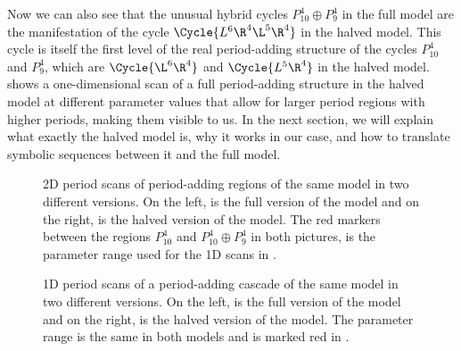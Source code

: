 Now we can also see that the unusual hybrid cycles $P_{10}^4 \oplus P_9^4$ in the full model are the manifestation of the cycle $\Cycle{L^6\R^4\L^5\R^4}$ in the halved model.
This cycle is itself the first level of the real period-adding structure of the cycles $P_{10}^4$ and $P_9^4$, which are $\Cycle{\L^6\R^4}$ and $\Cycle{L^5\R^4}$ in the halved model.
 shows a one-dimensional scan of a full period-adding structure in the halved model at different parameter values that allow for larger period regions with higher periods, making them visible to us.
In the next section, we will explain what exactly the halved model is, why it works in our case, and how to translate symbolic sequences between it and the full model.

\begin{figure}
	\centering
	\caption{
		2D period scans of period-adding regions of the same model in two different versions.
		On the left, is the full version of the model and on the right, is the halved version of the model.
		The red markers between the regions $P_{10}^4$ and $P_{10}^4 \oplus P_9^4$ in both pictures, is the parameter range used for the 1D scans in .
	}
	\label{fig:minrep.adding1.corner.period}
\end{figure}

\begin{figure}
	\centering
	\caption{
		1D period scans of a period-adding cascade of the same model in two different versions.
		On the left, is the full version of the model and on the right, is the halved version of the model.
		The parameter range is the same in both models and is marked red in .
	}
	\label{fig:minrep.adding1.motivation.halved.1d.period}
\end{figure}

